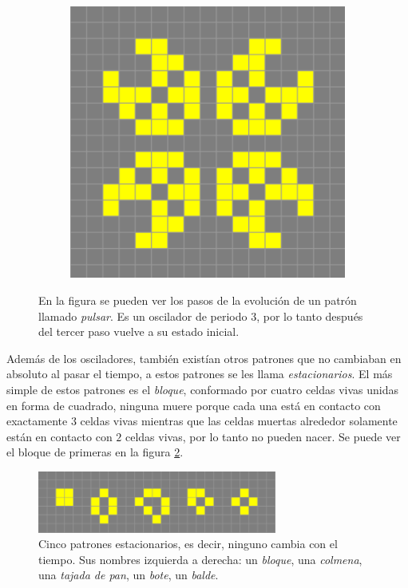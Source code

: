 \begin{figure}[h]
\begin{subfigure}{0.3\textwidth}
    \end{subfigure}
    \begin{subfigure}{0.3\textwidth}
        \includegraphics[width=\textwidth]{images/life-pulsar-3.png}
    \end{subfigure}
    \caption{En la figura se pueden ver los pasos de la evoluci\'on de un patr\'on llamado \textit{pulsar}. Es un oscilador de periodo 3, por lo tanto despu\'es del tercer paso vuelve a su estado inicial.}
    \label{figure:pulsar}
\end{figure}

Adem\'as de los osciladores, tambi\'en exist\'ian otros patrones que no cambiaban en absoluto al pasar el tiempo, a estos patrones se les llama \textit{estacionarios}. El m\'as simple de estos patrones es el \textit{bloque}, conformado por cuatro celdas vivas unidas en forma de cuadrado, ninguna muere porque cada una est\'a en contacto con exactamente $3$ celdas vivas mientras que las celdas muertas alrededor solamente est\'an en contacto con $2$ celdas vivas, por lo tanto no pueden nacer. Se puede ver el bloque de primeras en la figura \ref{figure:stationary}.

\begin{figure}[b]
    \centering
    \includegraphics[width=0.7\textwidth]{images/life-stationary.png}
    \caption{Cinco patrones estacionarios, es decir, ninguno cambia con el tiempo. Sus nombres izquierda a derecha: un \textit{bloque}, una \textit{colmena}, una \textit{tajada de pan}, un \textit{bote}, un \textit{balde}.}
    \label{figure:stationary}
\end{figure}

